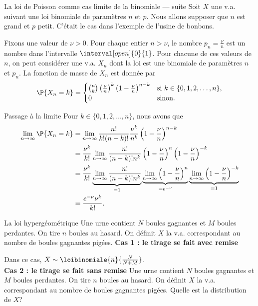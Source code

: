 \documentclass[nuit,charter,pied]{BeamerJS}
\begin{document}
\begin{frame}{La loi de Poisson comme cas limite de la binomiale --- suite}
	Soit $X$ une v.a. suivant une loi binomiale de paramètres $n$ et $p$. Nous allons supposer que $n$ est grand et $p$ petit. C'était le cas dans l'exemple de l'usine de bonbons.\pause
	
	Fixons une valeur de $\nu>0$. Pour chaque entier $n>\nu$, le nombre $p_n=\frac{\nu}{n}$ est un nombre dans l'intervalle $\interval[open]{0}{1}$. Pour chacune de ces valeurs de $n$, on peut considérer une v.a. $X_n$ dont la loi est une binomiale de paramètres $n$ et $p_n$. La fonction de masse de $X_n$ est donnée par
	\[
	\P{X_n=k}=\begin{cases} 
		\binom{n}{k}\left(\frac{\nu}{n}\right)^k\left(1-\frac{\nu}{n}\right)^{n-k} &\text{si}~k\in\{0,1,2,\ldots, n\},\\
		0 & \text{sinon}.
	\end{cases}
	\]
\end{frame}
\begin{frame}{Passage à la limite}
	Pour $k\in\{0,1,2,\ldots, n\}$, nous avons que
	\begin{align*}
		\lim_{n\rightarrow\infty}\P{X_n=k}&=\lim_{n\rightarrow\infty}\frac{n!}{k!(n-k)!}\frac{\nu^k}{n^k}\left(1-\frac{\nu}{n}\right)^{n-k}\\
		&=\frac{\nu^k}{k!}\lim_{n\rightarrow\infty}\frac{n!}{(n-k)!n^k}\left(1-\frac{\nu}{n}\right)^{n}\left(1-\frac{\nu}{n}\right)^{-k}\\
		&=\frac{\nu^k}{k!}\underbrace{\lim_{n\rightarrow\infty}\frac{n!}{(n-k)!n^k}}_{=1}\underbrace{\lim_{n\rightarrow\infty}\left(1-\frac{\nu}{n}\right)^{n}}_{=e^{-\nu}}\underbrace{\lim_{n\rightarrow\infty}\left(1-\frac{\nu}{n}\right)^{-k}}_{=1}\\
		&=\frac{e^{-\nu}\nu^k}{k!}.
	\end{align*}
\end{frame}
\begin{frame}{La loi hypergéométrique}
	Une urne contient $N$ boules gagnantes et $M$ boules perdantes. On tire $n$ boules au hasard. On définit $X$ la v.a. correspondant au nombre de boules gagnantes pigées.
	\vfill
	\pause
	\textbf{Cas 1 : le tirage se fait avec remise}
	
	Dans ce cas, $X\sim \loibinomiale{n}{\frac{N}{N+M}}$.\\
	\vfill
	\pause
	\textbf{Cas 2 : le tirage se fait sans remise}
	Une urne contient $N$ boules gagnantes et $M$ boules perdantes. On tire $n$ boules au hasard. On définit $X$ la v.a. correspondant au nombre de boules gagnantes pigées.
	Quelle est la distribution de $X$?
	\vfill
\end{frame}
\end{document}
